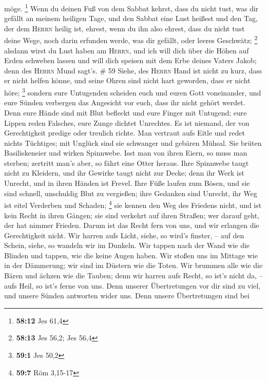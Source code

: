 möge. \footnote{\textbf{58:12} Jes 61,4}  Wenn du deinen
Fuß von dem Sabbat kehrst, dass du nicht tust, was dir gefällt an meinem
heiligen Tage, und den Sabbat eine Lust heißest und den Tag, der dem
\textsc{Herrn} heilig ist, ehrest, wenn du ihn also ehrest, dass du
nicht tust deine Wege, noch darin erfunden werde, was dir gefällt, oder
leeres Geschwätz; \footnote{\textbf{58:13} Jes 56,2; Jes 56,4}
 alsdann wirst du Lust haben am \textsc{Herrn}, und ich
will dich über die Höhen auf Erden schweben lassen und will dich speisen
mit dem Erbe deines Vaters Jakob; denn des \textsc{Herrn} Mund sagt's.
\# 59  Siehe, des \textsc{Herrn} Hand ist nicht zu kurz,
dass er nicht helfen könne, und seine Ohren sind nicht hart geworden,
dass er nicht höre; \footnote{\textbf{59:1} Jes 50,2} 
sondern eure Untugenden scheiden euch und euren Gott voneinander, und
eure Sünden verbergen das Angesicht vor euch, dass ihr nicht gehört
werdet.  Denn eure Hände sind mit Blut befleckt und eure
Finger mit Untugend; eure Lippen reden Falsches, eure Zunge dichtet
Unrechtes.  Es ist niemand, der von Gerechtigkeit predige
oder treulich richte. Man vertraut aufs Eitle und redet nichts
Tüchtiges; mit Unglück sind sie schwanger und gebären Mühsal.
 Sie brüten Basiliskeneier und wirken Spinnwebe. Isst man
von ihren Eiern, so muss man sterben; zertritt man's aber, so fährt eine
Otter heraus.  Ihre Spinnwebe taugt nicht zu Kleidern, und
ihr Gewirke taugt nicht zur Decke; denn ihr Werk ist Unrecht, und in
ihren Händen ist Frevel.  Ihre Füße laufen zum Bösen, und
sie sind schnell, unschuldig Blut zu vergießen; ihre Gedanken sind
Unrecht, ihr Weg ist eitel Verderben und Schaden; \footnote{\textbf{59:7}
  Röm 3,15-17}  sie kennen den Weg des Friedens nicht, und
ist kein Recht in ihren Gängen; sie sind verkehrt auf ihren Straßen; wer
darauf geht, der hat nimmer Frieden.  Darum ist das Recht
fern von uns, und wir erlangen die Gerechtigkeit nicht. Wir harren aufs
Licht, siehe, so wird's finster, -- auf den Schein, siehe, so wandeln
wir im Dunkeln.  Wir tappen nach der Wand wie die Blinden
und tappen, wie die keine Augen haben. Wir stoßen uns im Mittage wie in
der Dämmerung; wir sind im Düstern wie die Toten.  Wir
brummen alle wie die Bären und ächzen wie die Tauben; denn wir harren
aufs Recht, so ist's nicht da, -- aufs Heil, so ist's ferne von uns.
 Denn unserer Übertretungen vor dir sind zu viel, und
unsere Sünden antworten wider uns. Denn unsere Übertretungen sind bei

